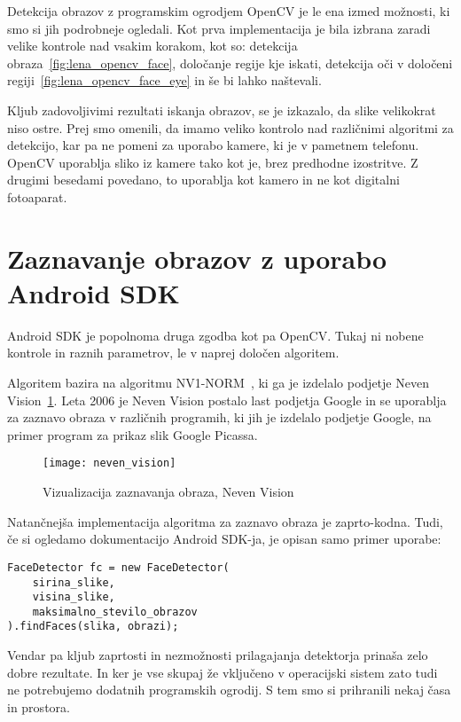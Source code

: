 Detekcija obrazov z programskim ogrodjem OpenCV je le ena izmed možnosti, ki
smo si jih podrobneje ogledali. Kot prva implementacija je bila izbrana zaradi
velike kontrole nad vsakim korakom, kot so: detekcija
obraza~\ref{fig:lena_opencv_face}, določanje regije kje iskati, detekcija oči
v določeni regiji~\ref{fig:lena_opencv_face_eye} in še bi lahko naštevali.

Kljub zadovoljivimi rezultati iskanja obrazov, se je izkazalo, da slike
velikokrat niso ostre. Prej smo omenili, da imamo veliko kontrolo nad
različnimi algoritmi za detekcijo, kar pa ne pomeni za uporabo kamere, ki je v
pametnem telefonu. OpenCV uporablja sliko iz kamere tako kot je, brez
predhodne izostritve. Z drugimi besedami povedano, to uporablja kot kamero in
ne kot digitalni fotoaparat.


\section{Zaznavanje obrazov z uporabo Android SDK}
Android SDK je popolnoma druga zgodba kot pa OpenCV. Tukaj ni nobene kontrole in raznih parametrov, le v naprej določen algoritem.

Algoritem bazira na algoritmu NV1-NORM~\cite{nevenFaceRecognition}, ki ga je
izdelalo podjetje Neven Vision~\ref{fig:neven_vision}. Leta 2006 je Neven
Vision postalo last podjetja Google in se uporablja za zaznavo obraza v
različnih programih, ki jih je izdelalo podjetje Google, na primer program za
prikaz slik Google Picassa.

\begin{figure}[!ht]
    \centering
    \texttt{[image: neven\_vision]}
    \caption{Vizualizacija zaznavanja obraza, Neven Vision}
    \label{fig:neven_vision}
\end{figure}

Natančnejša implementacija algoritma za zaznavo obraza je zaprto-kodna. Tudi,
če si ogledamo dokumentacijo Android SDK-ja, je opisan samo primer uporabe:
\begin{lstlisting}[caption="Primer uporabe zaznavanja obraza z orodjem Android SDK"]
FaceDetector fc = new FaceDetector(
    sirina_slike,
    visina_slike,
    maksimalno_stevilo_obrazov
).findFaces(slika, obrazi);
\end{lstlisting}

Vendar pa kljub zaprtosti in nezmožnosti prilagajanja detektorja prinaša zelo
dobre rezultate. In ker je vse skupaj že vključeno v operacijski sistem zato
tudi ne potrebujemo dodatnih programskih ogrodij. S tem smo si prihranili
nekaj časa in prostora.

